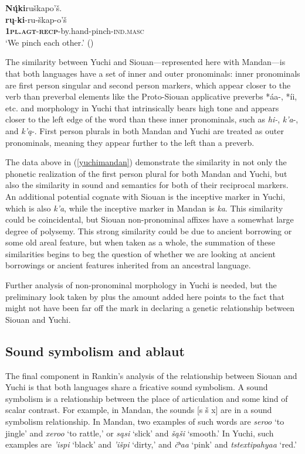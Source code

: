 \documentclass[output=paper]{LSP/langsci}
\begin{document}
	\ex  
	\glll \textbf{N\k{\'u}ki}ru\v{s}kapo'\v{s}. \\ 
	\textbf{r\k{u}}-\textbf{ki}-ru-\v{s}kap-o'\v{s}\\
			\textbf{\textsc{1pl.agt}}-\textbf{\textsc{recp}}-by.hand-pinch-\textsc{ind.masc}\\ 
	\glt `We pinch each other.' (\citealt[440]{Hollow1970})
\z
\z

The similarity between Yuchi and Siouan---represented here with Mandan---is that both languages have a set of inner and outer pronominals: inner pronominals are first person singular and second person markers, which appear closer to the verb than preverbal elements like the Proto-Siouan applicative preverbs *\'aa-, *\'ii, etc. and morphology in Yuchi that intrinsically bears high tone and appears closer to the left edge of the word than these inner pronominals, such as \emph{hi-}, \emph{k'a}-, and \emph{k'\k{a}}-. First person plurals in both Mandan and Yuchi are treated as outer pronominals, meaning they appear further to the left than a preverb.

The data above in (\ref{yuchimandan}) demonstrate the similarity in not only the phonetic realization of the first person plural for both Mandan and Yuchi, but also the similarity in sound and semantics for both of their reciprocal markers. An additional potential cognate with Siouan is the inceptive marker in Yuchi, which is also \emph{k'a}, while the inceptive marker in Mandan is \emph{ka}. This similarity could be coincidental, but Siouan non-pronominal affixes have a somewhat large degree of polysemy.  This strong similarity could be due to ancient borrowing or some old areal feature, but when taken as a whole, the summation of these similarities begins to beg the question of whether we are looking at ancient borrowings or ancient features inherited from an ancestral language. 

Further analysis of non-pronominal morphology in Yuchi is needed, but the preliminary look taken by \citet{Rankin1998scy} plus the amount added here points to the fact that \citet{Sapir1929} might not have been far off the mark in declaring a genetic relationship between Siouan and Yuchi.

\subsection{Sound symbolism and ablaut}

The final component in Rankin's \citeyear{Rankin1998scy} analysis of the relationship between Siouan and Yuchi is that both languages share a fricative sound symbolism. A sound symbolism is a relationship between the place of articulation and some kind of scalar contrast. For example, in Mandan, the sounds [s \v{s} x] are in a sound symbolism relationship. In Mandan, two examples of such words are \emph{seroo} `to jingle' and \emph{xeroo} `to rattle,' or \emph{s\k{a}si} `slick' and \emph{\v{s}\k{a}\v{s}i} `smooth.' In Yuchi, such examples are \emph{'ispi} `black' and \emph{'i\v{s}pi} `dirty,' and \emph{\v{c}ʰa\textbeltl a} `pink' and \emph{tstextipa{\super h}ya\textbeltl a} `red.'
\end{document}
